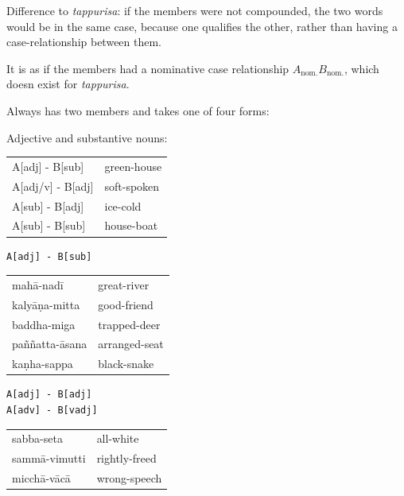 \documentclass[11pt,oneside]{memoir}
\begin{document}
Difference to \emph{tappurisa}: if the members were not compounded, the two words
would be in the same case, because one qualifies the other, rather than having a
case-relationship between them.

It is as if the members had a nominative case relationship \(A_{\text{nom.}}
B_{\text{nom.}}\), which doesn exist for \emph{tappurisa}.

Always has two members and takes one of four forms:

Adjective and substantive nouns:

\begin{center}
\begin{tabular}{ll}
A[adj] - B[sub] & green-house\\[0pt]
A[adj/v] - B[adj] & soft-spoken\\[0pt]
A[sub] - B[adj] & ice-cold\\[0pt]
A[sub] - B[sub] & house-boat\\[0pt]
\end{tabular}
\end{center}

\begin{verbatim}
A[adj] - B[sub]
\end{verbatim}


\begin{center}
\begin{tabular}{ll}
mahā-nadī & great-river\\[0pt]
kalyāṇa-mitta & good-friend\\[0pt]
baddha-miga & trapped-deer\\[0pt]
paññatta-āsana & arranged-seat\\[0pt]
kaṇha-sappa & black-snake\\[0pt]
\end{tabular}
\end{center}

\begin{verbatim}
A[adj] - B[adj]
A[adv] - B[vadj]
\end{verbatim}


\begin{center}
\begin{tabular}{ll}
sabba-seta & all-white\\[0pt]
sammā-vimutti & rightly-freed\\[0pt]
micchā-vācā & wrong-speech\\[0pt]
\end{tabular}
\end{center}
\end{document}
